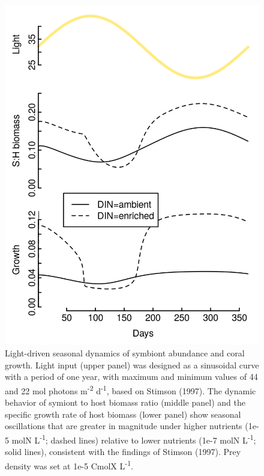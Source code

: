 \documentclass[]{elsarticle} %
\makeatletter
\def\maxwidth{\ifdim\Gin@nat@width>\linewidth\linewidth
\else\Gin@nat@width\fi}
\let\Oldincludegraphics\includegraphics
\renewcommand{\includegraphics}[1]{\Oldincludegraphics[width=\maxwidth]{#1}}
\makeatother
\begin{document}
\begin{figure}[htbp]
\centering
\includegraphics{../img/Fig5.png}
\caption{Light-driven seasonal dynamics of symbiont abundance and coral
growth. Light input (upper panel) was designed as a sinusoidal curve
with a period of one year, with maximum and minimum values of 44 and 22
mol photons m\textsuperscript{-2} d\textsuperscript{-1}, based on
Stimson (1997). The dynamic behavior of symiont to host biomass ratio
(middle panel) and the specific growth rate of host biomass (lower
panel) show seasonal oscillations that are greater in magnitude under
higher nutrients (1e-5 molN L\textsuperscript{-1}; dashed lines)
relative to lower nutrients (1e-7 molN L\textsuperscript{-1}; solid
lines), consistent with the findings of Stimson (1997). Prey density was
set at 1e-5 CmolX L\textsuperscript{-1}.}
\end{figure}
\end{document}
